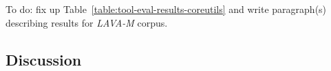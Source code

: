 To do: fix up Table~\ref{table:tool-eval-results-coreutils} and write paragraph(s) describing results for \emph{LAVA-M} corpus.



\subsection*{Discussion}
